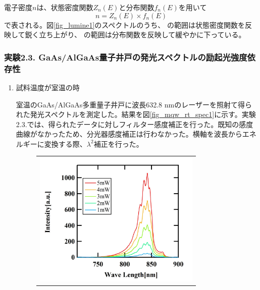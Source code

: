 \documentclass[11pt,a4j]{jsarticle}
\newlength{\circleboxwdht}
\newcommand{\centercircle}[1]{%
  \setlength{\circleboxwdht}{\wd\circlebox}%
  \addtolength{\circleboxwdht}{\dp\circlebox}%
  \raisebox{0.4\dp\circlebox}{%
    \parbox[][\circleboxwdht][c]{\wd\circlebox}{\centering#1}}%
  \llap{\usebox{\circlebox}}%
}	%
\begin{document}
電子密度$n$は、状態密度関数$Z_{n}(E)$と分布関数$f_{n}(E)$を用いて
\begin{equation}
 n=Z_{n}(E)\times f_{n}(E)
 \label{eq_spectrum}
\end{equation}
で表される。図\ref{fig_lumine1}のスペクトルのうち、\centercircle{1}の範囲は状態密度関数を反映して鋭く立ち上がり、\centercircle{2}の範囲は分布関数を反映して緩やかに下っている。

\newpage
\subsubsection{実験2.3. GaAs/AlGaAs量子井戸の発光スペクトルの励起光強度依存性}

\begin{enumerate}%
 \item 試料温度が室温の時

       室温のGaAs/AlGaAs多重量子井戸に波長632.8 nmのレーザーを照射て得られた発光スペクトルを測定した。結果を図\ref{fig_mqw_rt_spec1}に示す。実験2.3.では、得られたデータに対しフィルター感度補正を行った。既知の感度曲線がなかったため、分光器感度補正は行わなかった。横軸を波長からエネルギーに変換する際、$\lambda^2$補正を行った。

       \begin{figure}[ht]
        \centering
        \begin{tabular}{c}

         \begin{minipage}{0.52\hsize}

          \includegraphics[clip,width=8cm]{start2_MQW_rt_Spectrum_wav.jpg}
         \end{minipage}


\end{tabular}
\end{figure}
\end{enumerate}
\end{document}
